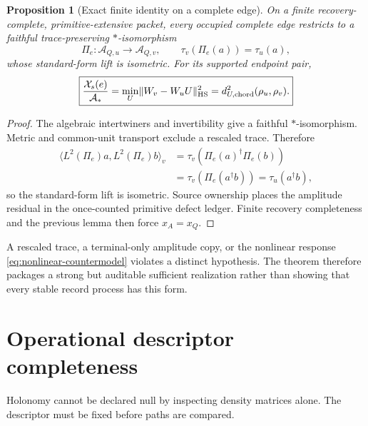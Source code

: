 \documentclass[11pt]{article}
\newtheorem{proposition}{Proposition}
\newcommand{\Astar}{\mathcal A_*}
\newcommand{\HS}{\mathrm{HS}}
\begin{document}
\begin{proposition}[Exact finite identity on a complete edge]
On a finite recovery-complete, primitive-extensive packet, every occupied
complete edge restricts to a faithful trace-preserving \(*\)-isomorphism
\begin{equation}
 \Pi_e:\mathcal A_{Q,u}\to\mathcal A_{Q,v},\qquad
 \tau_v(\Pi_e(a))=\tau_u(a),
 \label{eq:trace-preserving-isomorphism}
\end{equation}
whose standard-form lift is isometric.  For its supported endpoint pair,
\begin{equation}
 \boxed{{\mathcal X_s(e)\over\Astar}
 =\min_U\lVert W_v-W_uU\rVert_{\HS}^2
 =d_{U,\mathrm{chord}}^2(\rho_u,\rho_v).}
 \label{eq:complete-edge-a8b}
\end{equation}
\end{proposition}
\begin{proof}
The algebraic intertwiners and invertibility give a faithful
\(*\)-isomorphism.  Metric and common-unit transport exclude a rescaled trace.
Therefore
\begin{align}
 \langle L^2(\Pi_e)a,L^2(\Pi_e)b\rangle_v
 &=\tau_v\!\left(\Pi_e(a)^\dagger\Pi_e(b)\right)\\
 &=\tau_v\!\left(\Pi_e(a^\dagger b)\right)
 =\tau_u(a^\dagger b),
\end{align}
so the standard-form lift is isometric.  Source ownership places the
amplitude residual in the once-counted primitive defect ledger.  Finite
recovery completeness and the previous lemma then force \(x_A=x_Q\).
\end{proof}

A rescaled trace, a terminal-only amplitude copy, or the nonlinear response
\eqref{eq:nonlinear-countermodel} violates a distinct hypothesis.  The theorem
therefore packages a strong but auditable sufficient realization rather than
showing that every stable record process has this form.

\section{Operational descriptor completeness}

Holonomy cannot be declared null by inspecting density matrices alone.  The
descriptor must be fixed before paths are compared.
\end{document}
